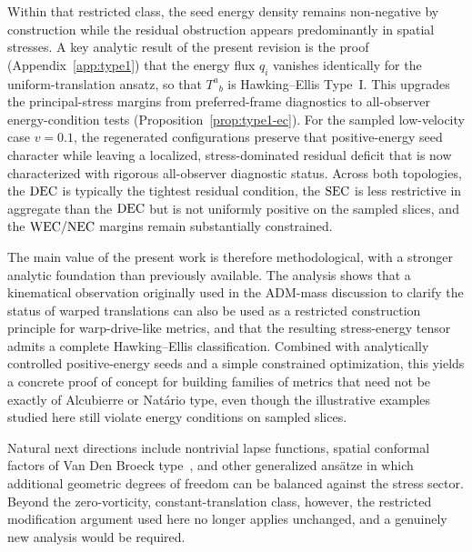 \documentclass[11pt]{article}
\makeatletter
\newcommand{\@abbr}[1]{\ifmmode\mathrm{#1}\else\textsc{#1}\fi}
\newcommand{\WEC}{\@abbr{WEC}}
\newcommand{\NEC}{\@abbr{NEC}}
\newcommand{\SEC}{\@abbr{SEC}}
\newcommand{\DEC}{\@abbr{DEC}}
\makeatother
\begin{document}
Within that restricted class, the seed energy density remains non-negative by construction while the residual obstruction appears predominantly in spatial stresses. A key analytic result of the present revision is the proof (Appendix~\ref{app:type1}) that the energy flux $q_i$ vanishes identically for the uniform-translation ansatz, so that $T^a{}_b$ is Hawking--Ellis Type~I. This upgrades the principal-stress margins from preferred-frame diagnostics to all-observer energy-condition tests (Proposition~\ref{prop:type1-ec}). For the sampled low-velocity case $v=0.1$, the regenerated configurations preserve that positive-energy seed character while leaving a localized, stress-dominated residual deficit that is now characterized with rigorous all-observer diagnostic status. Across both topologies, the $\DEC$ is typically the tightest residual condition, the $\SEC$ is less restrictive in aggregate than the $\DEC$ but is not uniformly positive on the sampled slices, and the $\WEC/\NEC$ margins remain substantially constrained.

The main value of the present work is therefore methodological, with a stronger analytic foundation than previously available. The analysis shows that a kinematical observation originally used in the ADM-mass discussion to clarify the status of warped translations can also be used as a restricted construction principle for warp-drive-like metrics, and that the resulting stress-energy tensor admits a complete Hawking--Ellis classification. Combined with analytically controlled positive-energy seeds and a simple constrained optimization, this yields a concrete proof of concept for building families of metrics that need not be exactly of Alcubierre or Nat\'ario type, even though the illustrative examples studied here still violate energy conditions on sampled slices.

Natural next directions include nontrivial lapse functions, spatial conformal factors of Van Den Broeck type~\cite{VanDenBroeck:1999}, and other generalized ans\"atze in which additional geometric degrees of freedom can be balanced against the stress sector. Beyond the zero-vorticity, constant-translation class, however, the restricted modification argument used here no longer applies unchanged, and a genuinely new analysis would be required.

\end{document}
